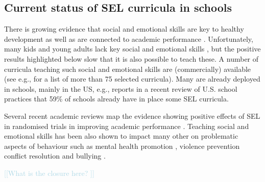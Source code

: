 \documentclass[prodmode,acmtochi]{acmsmall}
\newcommand{\todo}[1]{\textrm{\textrm{\textcolor{LightBlue}{[[#1]]} } } }
\begin{document}
\subsection{Current status of SEL curricula in schools}

There is growing evidence that social and emotional skills are key to healthy development \cite{Weare2011,Adi2009a,Damon2006} as well as are connected to academic performance \cite{Durlak2011,Caprara2000}. Unfortunately, many kids and young adults lack key social and emotional skills \cite{Foster2005},  %
but the positive results highlighted below slow that it is also possible to teach these.
%
A number of curricula teaching such social and emotional skills are (commercially) available (see e.g., \cite{CASEL2003,CASEL2013} for a list of more than 75 selected curricula). Many are already deployed in schools, mainly in the US, e.g.,   reports in a recent review of U.S. school practices that 59\% of schools already have in place some SEL curricula. %


Several recent academic reviews map the evidence showing positive effects of SEL in randomised trials in improving academic performance \cite{Durlak2011,Greenberg2010,Weare2011}. %
%
         Teaching social and emotional skills has been also shown to impact many other on problematic aspects of behaviour such as mental health promotion \cite{Adi et al 2007a}, violence prevention \cite{Mytton 2002,Adi2007b} conflict resolution \cite{Garrard and Lipsey, 2007} and bullying \cite{Vreeman and Carroll, 2007}. 
        
        \todo{What is the closure here? }
        
        
\end{document}
